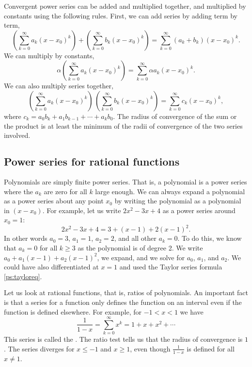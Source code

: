 \documentclass{ximera}
\begin{document}
Convergent power series can be added and multiplied together, and multiplied by constants using the following rules.  First, we can add series by adding term by term,
\begin{equation*}
    \left(\sum_{k=0}^\infty a_k {(x-x_0)}^k\right) + \left(\sum_{k=0}^\infty b_k {(x-x_0)}^k\right) = \sum_{k=0}^\infty (a_k+b_k) {(x-x_0)}^k .
\end{equation*}
We can multiply by constants,
\begin{equation*}
    \alpha \left(\sum_{k=0}^\infty a_k {(x-x_0)}^k\right) = \sum_{k=0}^\infty \alpha a_k {(x-x_0)}^k .
\end{equation*}
We can also multiply series together,
\begin{equation*}
    \left(\sum_{k=0}^\infty a_k {(x-x_0)}^k\right) \, \left(\sum_{k=0}^\infty b_k {(x-x_0)}^k\right) = \sum_{k=0}^\infty c_k {(x-x_0)}^k ,
\end{equation*}
where $c_k = a_0b_k + a_1 b_{k-1} + \cdots + a_k b_0$. The radius of convergence of the sum or the product is at least the minimum of the radii of convergence of the two series involved.

\subsection{Power series for rational functions}

Polynomials are simply finite power series.  That is, a polynomial is a power series where the $a_k$ are zero for all $k$ large enough.  We can always expand a polynomial as a power series about any point $x_0$ by writing the polynomial as a polynomial in $(x-x_0)$.  For example, let us write $2x^2-3x+4$ as a power series around $x_0 = 1$:
\begin{equation*}
    2x^2-3x+4 = 3 + (x-1) + 2{(x-1)}^2 .
\end{equation*}
In other words $a_0 = 3$, $a_1 = 1$, $a_2 = 2$, and all other $a_k = 0$.  To do this, we know that $a_k = 0$ for all $k \geq 3$ as the polynomial is of degree 2. We write $a_0 + a_1(x-1) + a_2{(x-1)}^2$, we expand, and we solve for $a_0$, $a_1$, and $a_2$.  We could have also differentiated at $x=1$ and used the Taylor series formula \eqref{ps:tayloreq}.

Let us look at rational functions, that is, ratios of polynomials. An important fact is that a series for a function only defines the function on an interval even if the function is defined elsewhere.  For example, for $-1 < x < 1$ we have
\begin{equation*}
    \frac{1}{1-x} = \sum_{k=0}^\infty x^k = 1 + x + x^2 + \cdots
\end{equation*}
This series is called the \emph{}.  The ratio test tells us that the radius of convergence is $1$.  The series diverges for $x \leq -1$ and $x \geq 1$, even though $\frac{1}{1-x}$ is defined for all $x \not= 1$.
\end{document}
